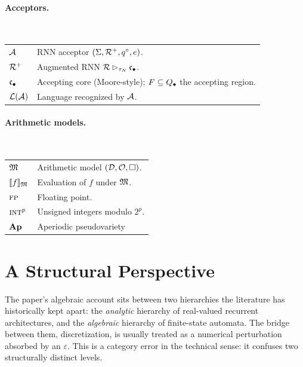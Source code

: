 \documentclass{article}
\begin{document}
\paragraph{Acceptors.}\mbox{}\\
\begin{tabular}{@{}p{2cm}p{12.5cm}@{}}
$\mathcal{A}$ & RNN acceptor $(\Sigma, {\mathcal{R}^{+}}, q^{\circ}, e)$. \\
${\mathcal{R}^{+}}$ & Augmented RNN $\mathcal{R} \mathbin{\rhd_{\tau_N}} {\mathfrak{c}_{\bullet}}$. \\
${\mathfrak{c}_{\bullet}}$ & Accepting core (Moore-style); $F \subseteq Q_\bullet$ the accepting region. \\
$\mathcal{L}(\mathcal{A})$ & Language recognized by $\mathcal{A}$. \\
\end{tabular}

\paragraph{Arithmetic models.}\mbox{}\\
\begin{tabular}{@{}p{2cm}p{12.5cm}@{}}
$\mathfrak{M}$ & Arithmetic model $(\mathcal{D}, \mathcal{O}, \square)$. \\
$\llbracket f \rrbracket_{\mathfrak{M}}$ & Evaluation of $f$ under $\mathfrak{M}$. \\
$\textsc{fp}$ & Floating point. \\
$\textsc{int}^p$ & Unsigned integers modulo $2^p$. \\
$\mathbf{Ap}$ & Aperiodic pseudovariety \\
\end{tabular}
\newpage

\section{A Structural Perspective}\label{sec:structural-perspective}
The paper's algebraic account sits between two hierarchies the literature has historically kept apart: the \emph{analytic} hierarchy of real-valued recurrent architectures, and the \emph{algebraic} hierarchy of finite-state automata. 
The bridge between them, discretization, is usually treated as a numerical perturbation absorbed by an $\varepsilon$. 
This is a category error in the technical sense: it confuses two structurally distinct levels.
\end{document}
